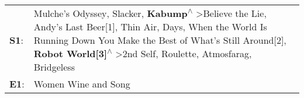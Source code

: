 \begin{supertabular}{p{0.03\textwidth}p{0.92\textwidth}}
 \textbf{S1}:  &  Mulche's Odyssey\textsuperscript{}, \enspace Slacker\textsuperscript{}, \enspace \textbf{Kabump\textsuperscript{$\wedge$}} \textgreater \enspace Believe the Lie\textsuperscript{}, \enspace Andy's Last Beer[1]\textsuperscript{}, \enspace Thin Air\textsuperscript{},  Days\textsuperscript{}, \enspace When the World Is Running Down You Make the Best of What's Still Around[2]\textsuperscript{}, \enspace \textbf{Robot World[3]\textsuperscript{$\wedge$}} \textgreater \enspace 2nd Self\textsuperscript{}, \enspace Roulette\textsuperscript{}, \enspace Atmosfarag\textsuperscript{}, \enspace Bridgeless\textsuperscript{}  \enspace  \\
 \textbf{E1}:  &                                                                                                                                                                                                                                                                                                                                                                                                                                                                                                                                                                                                               Women Wine and Song\textsuperscript{}  \enspace  \\
\end{supertabular}
